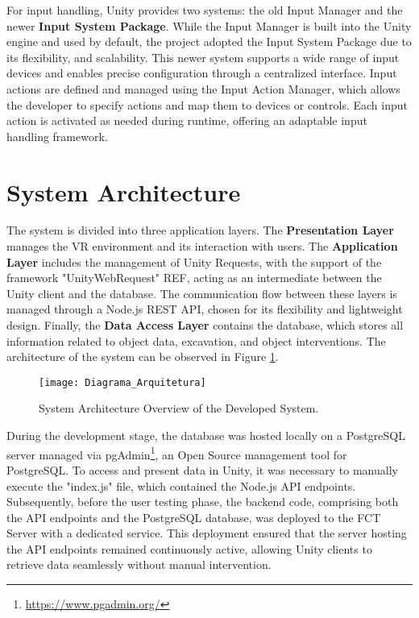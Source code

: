For input handling, Unity provides two systems: the old Input Manager and the newer \textbf{Input System Package}. 
While the Input Manager is built into the Unity engine and used by default, the project adopted the Input System Package due to its flexibility, and scalability. 
This newer system supports a wide range of input devices and enables precise configuration through a centralized interface. Input actions are defined and managed using the Input Action Manager, which allows the developer to specify actions and map them to devices or controls. 
Each input action is activated as needed during runtime, offering an adaptable input handling framework.


\section{System Architecture}

The system is divided into three application layers.
The \textbf{Presentation Layer} manages the \gls{VR} environment and its interaction with users. The \textbf{Application Layer} includes the management of Unity Requests, with the support of the framework "UnityWebRequest" REF, acting as an intermediate between the Unity client and the database. 
The communication flow between these layers is managed through a Node.js REST API, chosen for its flexibility and lightweight design. 
Finally, the \textbf{Data Access Layer} contains the database, which stores all information related to object data, excavation, and object interventions. 
The architecture of the system can be observed in Figure \ref{fig:architecture}.
\begin{figure}[h!]
    \centering
    \texttt{[image: Diagrama\_Arquitetura]}
    \caption{System Architecture Overview of the Developed System.} 
    \label{fig:architecture}
\end{figure}

During the development stage, the database was hosted locally on a PostgreSQL server managed via pgAdmin\footnote{\url{https://www.pgadmin.org/}}, an Open Source management tool for PostgreSQL. To access and present data in Unity, it was necessary to manually execute the "index.js" file, which contained the Node.js API endpoints.
Subsequently, before the user testing phase, the backend code, comprising both the API endpoints and the PostgreSQL database, was deployed to the FCT Server with a dedicated service.
This deployment ensured that the server hosting the API endpoints remained continuously active, allowing Unity clients to retrieve data seamlessly without manual intervention.

